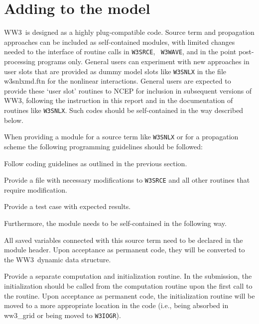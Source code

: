 \documentclass[12pt]{article}
\newcommand{\ws}{WW3}
\newcommand{\file}{\sf}
\newcommand{\code}{\tt}
\newcommand{\pb}{\strut \vfill \pagebreak}
\newcommand{\newsec}{\setcounter{equation}{0}
                      \setcounter{myfigno}{0}
                      \setcounter{mytabno}{0}}
\newcounter{myfigno}[section]
\newcounter{mytabno}[section]
\newcounter{mylistno}
\begin{document}
\pb
\section{Adding to the model} \label{sec:add}
\newsec

\ws\ is designed as a highly plug-compatible code.  Source term and
propagation approaches can be included as self-contained modules, with limited
changes needed to the interface of routine calls in {\code W3SRCE}, {\code
W3WAVE}, and in the point post-processing programs only. General users can
experiment with new approaches in user slots that are provided as dummy model
slots like {\code W3SNLX} in the file {\file w3snlxmd.ftn} for the nonlinear
interactions. General users are expected to provide these `user slot' routines
to NCEP for inclusion in subsequent versions of \ws, following the instruction
in this report and in the documentation of routines like {\code W3SNLX}.  Such
codes should be self-contained in the way described below.

When providing a module for a source term like {\code W3SNLX} or for a
propagation scheme the following programming guidelines should be followed:

\begin{list}{)}{ \rightmargin 8mm
                                \leftmargin 10mm }
\item Follow coding guidelines as outlined in the previous section.
\item Provide a file with necessary modifications to {\code W3SRCE} and all
      other routines that require modification.
\item Provide a test case with expected results.
\end{list}

\noindent
Furthermore, the module needs to be self-contained in the following way.

\begin{list}{)}{ \rightmargin 8mm
                                \leftmargin 10mm }
\item All saved variables connected with this source term need to be declared
      in the module header. Upon acceptance as permanent code, they will be
      converted to the \ws\ dynamic data structure.
\item Provide a separate computation and initialization routine.  In the
      submission, the initialization should be called from the computation
      routine upon the first call to the routine. Upon acceptance as permanent
      code, the initialization routine will be moved to a more appropriate
      location in the code (i.e., being absorbed in {\file ww3\_grid} or being
      moved to {\code W3IOGR}).
\end{list}
\end{document}
